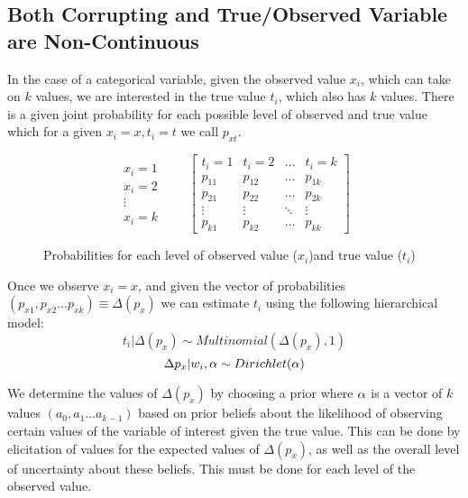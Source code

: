 \documentclass[fignum,letterpaper,12pt]{article}
\begin{document}
\subsection{Both Corrupting and True/Observed Variable are Non-Continuous} \label{subsec:case4}

In the case of a categorical variable, given the observed value $x_i$, which can take on $k$ values, we are interested in the true value $t_i$, which also has $k$ values. There is a given joint probability for each possible level of observed and true value which for a given $x_{i}=x, t_{i}=t$ we call $p_{xt}$.
\begin{figure}
\begin{equation*}
\begin{matrix}
\\
x_{i}=1 \\
x_{i}=2 \\
\vdots \\
x_{i}=k \\

\end{matrix} \qquad
\begin{bmatrix}
t_{i}=1 & t_{i} = 2 & \hdots & t_{i} = k \\
p_{11} & p_{12} & \ldots
& p_{1k} \\
p_{21} & p_{22} & \ldots
& p_{2k} \\
\vdots & \vdots & \ddots
& \vdots \\
p_{k1} & p_{k2} & \ldots
& p_{kk}
\end{bmatrix}
\end{equation*}
\caption{Probabilities for each level of observed value ($x_{i}$)and true value ($t_{i}$)}
\end{figure}

Once we observe $x_{i}=x$, and given the vector of probabilities $(p_{x1}, p_{x2}...p_{xk}) \equiv \Delta (p_{x})$ we can estimate $t_{i}$ using the following hierarchical model:
\begin{equation}
t_{i}| \Delta (p_{x}) \sim Multinomial (\Delta (p_{x}),1)
\end{equation}
\begin{equation}
\Delta p_{x}|w_{i},\alpha \sim Dirichlet(\bf{\alpha})
\end{equation}

We determine the values of $\Delta (p_{x})$ by choosing a prior where $\bf{\alpha}$ is a vector of $k$ values $(a_{0}, a_{1} \hdots a_{k-1})$ based on prior beliefs about the likelihood of observing certain values of the variable of interest given the true value. This can be done by elicitation of values for the expected values of $\Delta (p_{x})$, as well as the overall level of uncertainty about these beliefs. This must be done for each level of the observed value.
\end{document}
